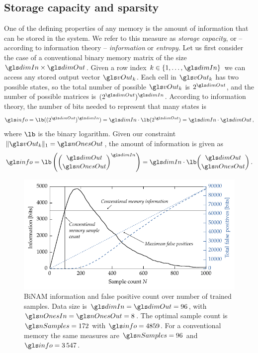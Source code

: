 \subsection{Storage capacity and sparsity}
\label{sec:binam_storage_capacity}

One of the defining properties of any memory is the amount of information that can be stored in the system. We refer to this measure as \emph{storage capacity}, or -- according to information theory -- \emph{information} or \emph{entropy}. Let us first consider the case of a conventional binary memory matrix \memMat of the size $\dimIn \times \dimOut$. Given a row index $k \in \{1, \ldots, \dimIn\}$ we can access any stored output vector $\vOut_k$. Each cell in $\vOut_k$ has two possible states, so the total number of possible $\vOut_k$ is $2^{\dimOut}$, and the number of possible matrices \memMat is $(2^{\dimOut})^{\dimIn}$. According to information theory, the number of bits \info needed to represent that many states is \cite{shannon2001mathematical}
\begin{align}
	\info = \lb((2^{\dimOut})^{\dimIn}) = \dimIn \cdot \lb(2^{\dimOut})= \dimIn \cdot \dimOut \,,
\end{align}
where $\lb$ is the binary logarithm. Given our constraint $\| \vOut_k \|_1 = \nOnesOut$, the amount of information is given as
\begin{align}
	\info = \lb\left(\binom{\dimOut}{\nOnesOut}^{\dimIn}\right) = \dimIn \cdot \lb \binom{\dimOut}{\nOnesOut}\,.
\end{align}

\begin{figure}[t]
	\centering
	\includegraphics[trim=0.25cm 0.0cm 0.25cm 0.0cm,clip]{media/chp2/sketch_info.pdf}
	\caption[BiNAM information and false positive count over number of trained samples]{BiNAM information and false positive count over number of trained samples. Data size is $\dimIn = \dimOut = 96$, with $\nOnesIn = \nOnesOut = 8$. The optimal sample count is $\nSamples = 172$ with $\info = 4859$. For a conventional memory the same measures are $\nSamples = 96$ and $\info = 3\,547$.}
	\label{fig:sketch_info}
\end{figure}

